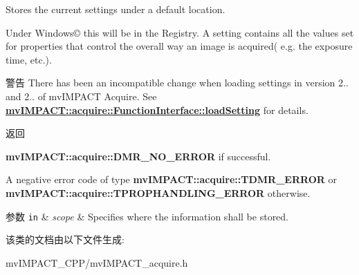 Stores the current settings under a default location. 

Under Windows\copyright{} this will be in the Registry. A setting contains all the values set for properties that control the overall way an image is acquired( e.\+g. the exposure time, etc.).

\begin{DoxyWarning}{警告}
There has been an incompatible change when loading settings in version 2.. and 2.. of mv\+I\+M\+P\+A\+C\+T Acquire. See {\bfseries \hyperlink{classmv_i_m_p_a_c_t_1_1acquire_1_1_function_interface_ab670f49c3a55f7e90d52935a9194bdb0}{mv\+I\+M\+P\+A\+C\+T\+::acquire\+::\+Function\+Interface\+::load\+Setting}} for details.
\end{DoxyWarning}
\begin{DoxyReturn}{返回}

\begin{DoxyItemize}
\item {\bfseries mv\+I\+M\+P\+A\+C\+T\+::acquire\+::\+D\+M\+R\+\_\+\+N\+O\+\_\+\+E\+R\+R\+O\+R} if successful.
\item A negative error code of type {\bfseries mv\+I\+M\+P\+A\+C\+T\+::acquire\+::\+T\+D\+M\+R\+\_\+\+E\+R\+R\+O\+R} or {\bfseries mv\+I\+M\+P\+A\+C\+T\+::acquire\+::\+T\+P\+R\+O\+P\+H\+A\+N\+D\+L\+I\+N\+G\+\_\+\+E\+R\+R\+O\+R} otherwise. 
\end{DoxyItemize}
\end{DoxyReturn}

\begin{DoxyParams}[1]{参数}
\mbox{\tt in}  & {\em scope} & Specifies where the information shall be stored. \\
\hline
\end{DoxyParams}


该类的文档由以下文件生成\+:\begin{DoxyCompactItemize}
\item 
mv\+I\+M\+P\+A\+C\+T\+\_\+\+C\+P\+P/mv\+I\+M\+P\+A\+C\+T\+\_\+acquire.\+h\end{DoxyCompactItemize}
